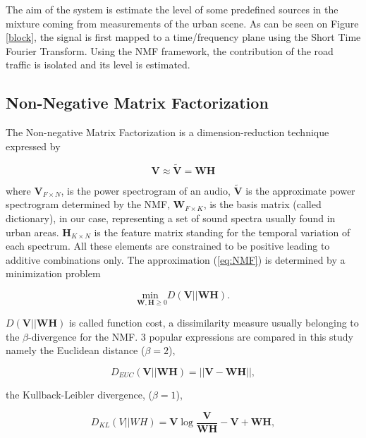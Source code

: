 \documentclass{article}
\begin{document}
\begin{sloppy}
The aim of the system is estimate the level of some predefined sources in the mixture coming from measurements of the urban scene. As can be seen on Figure \ref{block}, the signal is first mapped to a time/frequency plane using the Short Time Fourier Transform. Using the NMF framework, the contribution of the road traffic is isolated and its level is estimated.

\subsection{Non-Negative Matrix Factorization}
The Non-negative Matrix Factorization is a dimension-reduction technique expressed by

\begin{equation}\label{eq:NMF}
\mathbf{V} \approx \mathbf{\tilde{V}} = \mathbf{WH}
\end{equation}

where $\mathbf{V}_{F \times N}$, is the power spectrogram of an audio, $\mathbf{\tilde{V}}$ is the approximate power spectrogram determined by the NMF, $\mathbf{W}_{F \times K}$, is the basis matrix (called dictionary), in our case, representing a set of sound spectra usually found in urban areas. $\mathbf{H}_{K \times N}$ is the feature matrix standing for the temporal variation of each spectrum. All these elements are constrained to be positive leading to additive combinations only. The approximation (\ref{eq:NMF}) is determined by a minimization problem

\begin{equation}\label{eq:minCost}
\underset{\mathbf{W},\mathbf{H} \geq 0}{\text{min }} D(\mathbf{V}\vert\vert \mathbf{WH}).
\end{equation}

$D(\mathbf{V}\vert\vert \mathbf{WH})$ is called function cost, a dissimilarity measure usually belonging to the $\beta$-divergence for the NMF. 3 popular expressions are compared in this study namely the Euclidean distance ($\beta = 2$),

\begin{equation}\label{eq:distEUC}
D_{EUC}(\mathbf{V} \vert \vert \mathbf{WH}) =  \vert\vert \mathbf{V} - \mathbf{WH} \vert\vert , 
\end{equation} 

the Kullback-Leibler divergence, ($\beta = 1$), 

\begin{equation}\label{eq:divKL}
D_{KL}(V\vert\vert WH) = \mathbf{V}\log\frac{\mathbf{V}}{\mathbf{WH}}-\mathbf{V}+\mathbf{WH},
\end{equation}


\end{sloppy}
\end{document}
